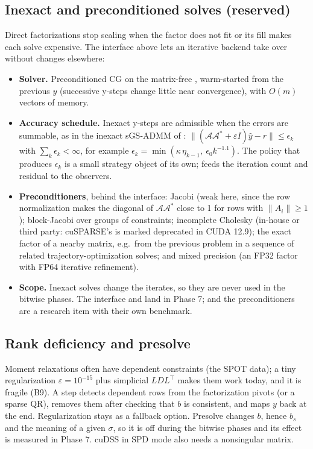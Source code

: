 \documentclass[11pt]{article}
\newcommand{\A}{\mathcal{A}}
\newcommand{\Ad}{\mathcal{A}^{*}}
\newcommand{\norm}[1]{\lVert #1\rVert}
\begin{document}
\subsection{Inexact and preconditioned solves (reserved)}\label{sec:pcg}
Direct factorizations stop scaling when the factor does not fit or its fill makes each solve expensive. The
interface above lets an iterative backend take over without changes elsewhere:
\begin{itemize}
  \item \textbf{Solver.} Preconditioned CG on the matrix-free , warm-started from the
  previous $y$ (successive y-steps change little near convergence), with $O(m)$ vectors of memory.
  \item \textbf{Accuracy schedule.} Inexact y-steps are admissible when the errors are summable, as in the
  inexact sGS-ADMM of \cite{chen2017}: $\norm{(\A\Ad+\varepsilon I)\hat y - r}\le\epsilon_k$ with
  $\sum_k\epsilon_k<\infty$, for example $\epsilon_k = \min(\kappa\,\eta_{k-1},\ \epsilon_0 k^{-1.1})$. The
  policy that produces $\epsilon_k$ is a small strategy object of its own;  feeds the
  iteration count and residual to the observers.
  \item \textbf{Preconditioners}, behind the  interface: Jacobi (weak here, since the row
  normalization makes the diagonal of $\A\Ad$ close to 1 for rows with $\norm{A_i}\ge1$); block-Jacobi over
  groups of constraints; incomplete Cholesky (in-house or third party: cuSPARSE's  is marked
  deprecated in CUDA 12.9); the exact factor of a nearby matrix, e.g.\ from the previous problem in a
  sequence of related trajectory-optimization solves; and mixed precision (an FP32 factor with FP64
  iterative refinement).
  \item \textbf{Scope.} Inexact solves change the iterates, so they are never used in the bitwise phases.
  The interface and  land in Phase 7;  and the preconditioners are a
  research item with their own benchmark.
\end{itemize}

\subsection{Rank deficiency and presolve}
Moment relaxations often have dependent constraints (the SPOT data); a tiny regularization
$\varepsilon = 10^{-15}$ plus simplicial $LDL^\top$ makes them work today, and it is fragile (B9). A
 step detects dependent rows from the factorization pivots (or a sparse QR), removes them after
checking that $b$ is consistent, and maps $y$ back at the end. Regularization stays as a fallback option.
Presolve changes $b$, hence $b_s$ and the meaning of a given $\sigma$, so it is off during the bitwise phases
and its effect is measured in Phase 7. cuDSS in SPD mode also needs a nonsingular matrix.
\end{document}
